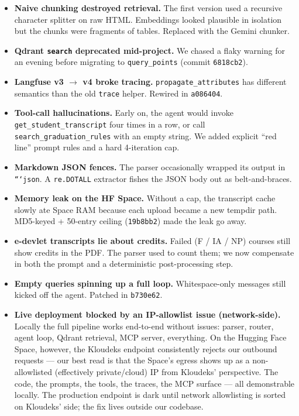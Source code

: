 \documentclass[11pt,a4paper]{article}
\begin{document}
\begin{itemize}[leftmargin=*, itemsep=0.15em]
    \item \textcolor{accentred}{\textbf{Naive chunking destroyed retrieval.}}
          The first version used a recursive character splitter on raw HTML.
          Embeddings looked plausible in isolation but the chunks were
          fragments of tables. Replaced with the Gemini chunker.
    \item \textcolor{accentred}{\textbf{Qdrant \texttt{search} deprecated mid-project.}}
          We chased a flaky warning for an evening before migrating to
          \texttt{query\_points} (commit \texttt{6818cb2}).
    \item \textcolor{accentred}{\textbf{Langfuse v3 $\rightarrow$ v4 broke tracing.}}
          \texttt{propagate\_attributes} has different semantics than the old
          \texttt{trace} helper. Rewired in \texttt{a086404}.
    \item \textcolor{accentred}{\textbf{Tool-call hallucinations.}} Early on,
          the agent would invoke \texttt{get\_student\_transcript} four times
          in a row, or call \texttt{search\_graduation\_rules} with an empty
          string. We added explicit ``red line'' prompt rules and a hard
          4-iteration cap.
    \item \textcolor{accentred}{\textbf{Markdown JSON fences.}} The parser
          occasionally wrapped its output in \texttt{```json}. A
          \texttt{re.DOTALL} extractor fishes the JSON body out as
          belt-and-braces.
    \item \textcolor{accentred}{\textbf{Memory leak on the HF Space.}} Without
          a cap, the transcript cache slowly ate Space RAM because each upload
          became a new tempdir path. MD5-keyed + 50-entry ceiling
          (\texttt{19b8bb2}) made the leak go away.
    \item \textcolor{accentred}{\textbf{e-devlet transcripts lie about credits.}}
          Failed (F / IA / NP) courses still show credits in the PDF. The
          parser used to count them; we now compensate in both the prompt and
          a deterministic post-processing step.
    \item \textcolor{accentred}{\textbf{Empty queries spinning up a full loop.}}
          Whitespace-only messages still kicked off the agent. Patched in
          \texttt{b730e62}.
    \item \textcolor{accentred}{\textbf{Live deployment blocked by an
          IP-allowlist issue (network-side).}} Locally the full pipeline works
          end-to-end without issues: parser, router, agent loop, Qdrant
          retrieval, MCP server, everything. On the Hugging Face Space,
          however, the Kloudeks endpoint consistently rejects our outbound
          requests --- our best read is that the Space's egress shows up as a
          non-allowlisted (effectively private/cloud) IP from Kloudeks'
          perspective. The code, the prompts, the tools, the traces, the MCP
          surface --- all demonstrable locally. The production endpoint is
          dark until network allowlisting is sorted on Kloudeks' side; the
          fix lives outside our codebase.
\end{itemize}
\end{document}
